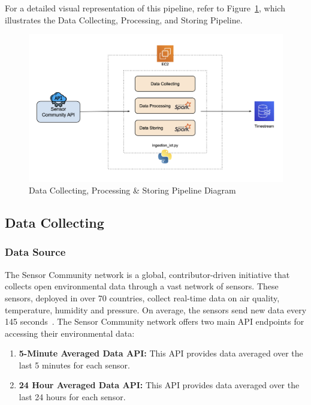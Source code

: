 \documentclass[12pt,oneside]{book} %
\begin{document}
For a detailed visual representation of this pipeline, refer to
Figure~\ref{fig:data-collecting-processing-storing-pipeline}, which illustrates
the Data Collecting, Processing, and Storing Pipeline.

\begin{figure}[H]
    \centering
    \includegraphics[width=1\linewidth]{images/cloud-computing-data-ingestion.png}
    \caption{Data Collecting, Processing \& Storing Pipeline Diagram}\label{fig:data-collecting-processing-storing-pipeline}
\end{figure}

\subsection{Data Collecting}
\subsubsection{Data Source}
The Sensor Community network is a global, contributor-driven initiative that
collects open environmental data through a vast network of sensors. These
sensors, deployed in over 70 countries, collect real-time data on air quality,
temperature, humidity and pressure. On average, the sensors send new data every
145 seconds~\cite{sensorcommunity2023synchronization}. The Sensor Community
network offers two main API endpoints for accessing their environmental data:

\begin{enumerate}
    \item \textbf{5-Minute Averaged Data API:} This API provides data averaged over the last 5 minutes for each sensor.
    \item \textbf{24 Hour Averaged Data API:} This API provides data averaged over the last 24 hours for each sensor.
\end{enumerate}
\end{document}
